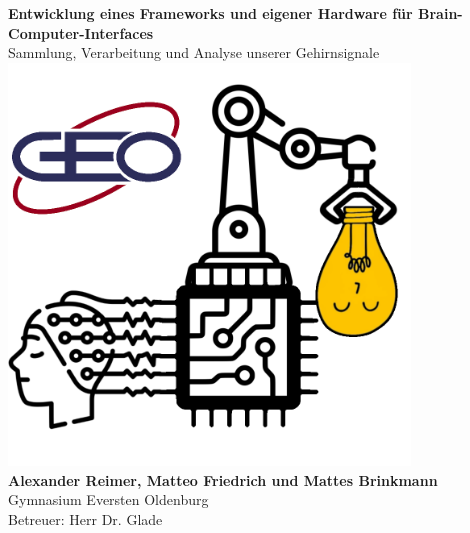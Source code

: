 \documentclass[10pt]{article}
\begin{document}


\thispagestyle{empty}

\vspace*{10mm}
\begin{center}
    {\Huge \textbf{\sansemph Entwicklung eines Frameworks und eigener Hardware für Brain-Computer-Interfaces}} \\[2mm]
    {\Large Sammlung, Verarbeitung und Analyse unserer Gehirnsignale} \\[4mm]
    \includegraphics[width=0.8\textwidth]{logo.png} \\[10mm]
    {\huge \textbf{Alexander Reimer, Matteo Friedrich und Mattes Brinkmann}} \\[1em]
    {\LARGE {Gymnasium Eversten Oldenburg}} \\[1.2ex]
    {\LARGE {Betreuer: Herr Dr. Glade}}
\end{center}

\newpage
\pagestyle{fancy}
\fancyhead{}
\fancyhead[L]{\rightmark}


\tableofcontents
\end{document}
